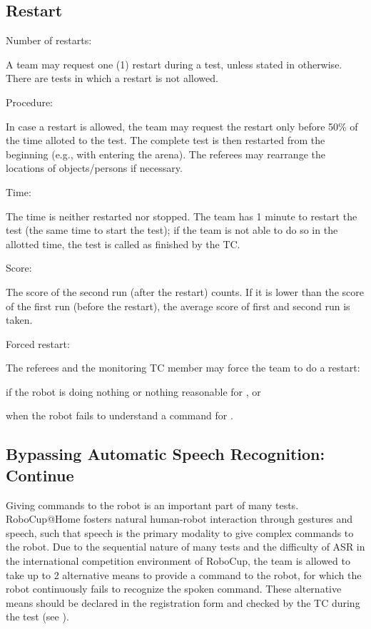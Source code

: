\subsection{Restart}\label{rule:restart}
\begin{enumerate}
{\bf\item Number of restarts:} A team may request one (1) restart during a test, unless stated in otherwise.
There are tests in which a restart is not allowed.
{\bf\item Procedure:} In case a restart is allowed, the team may request the restart only before 50\% of the time alloted to the test.
The complete test is then restarted from the beginning (e.g., with entering the arena).  
The referees may rearrange the locations of objects/persons if necessary.
{\bf\item Time:} The time is neither restarted nor stopped. The team has 1 minute to restart the test (the same time to start the test); if the team is not able to do so in the allotted time, the test is called as finished by the TC.
{\bf\item Score:} The score of the second run (after the restart) counts. 
If it is lower than the score of the first run (before the restart),  
the average score of first and second run is taken.
{\bf\item Forced restart:} The referees and the monitoring TC member may force the team to do a restart:
\begin{compactitem}
  \item if the robot is doing nothing or nothing reasonable for , or
  \item when the robot fails to understand a command for .
\end{compactitem}  
\end{enumerate}


\subsection{Bypassing Automatic Speech Recognition: Continue}\label{rule:asrcontinue}

Giving commands to the robot is an important part of many tests.
RoboCup@Home fosters natural human-robot interaction through gestures and speech, such that speech is the primary modality to give complex commands to the robot.
Due to the sequential nature of many tests and the difficulty of ASR in the international competition environment of RoboCup,
the team is allowed to take up to 2 alternative means to provide a command to the robot, for which the robot continuously fails to recognize the spoken command.
These alternative means should be declared in the registration form and checked by the TC during the  test (see ).

